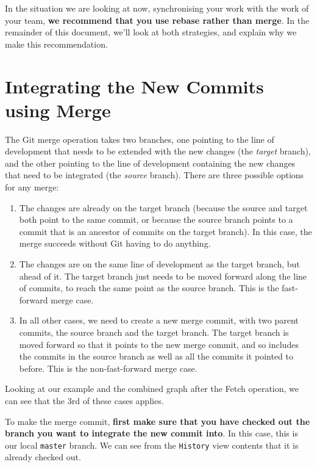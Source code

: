 \documentclass[
]{book}
\providecommand{\tightlist}{%
  \setlength{\itemsep}{0pt}\setlength{\parskip}{0pt}}
\begin{document}
In the situation we are looking at now, synchronising your work with the work of your team, \textbf{we recommend that you use rebase rather than merge}. In the remainder of this document, we'll look at both strategies, and explain why we make this recommendation.

\hypertarget{integrating-the-new-commits-using-merge}{%
\section{Integrating the New Commits using Merge}\label{integrating-the-new-commits-using-merge}}

The Git merge operation takes two branches, one pointing to the line of development that needs to be extended with the new changes (the \emph{target} branch), and the other pointing to the line of development containing the new changes that need to be integrated (the \emph{source} branch). There are three possible options for any merge:

\begin{enumerate}
\def\labelenumi{\arabic{enumi}.}
\tightlist
\item
  The changes are already on the target branch (because the source and target both point to the same commit, or because the source branch points to a commit that is an ancestor of commits on the target branch). In this case, the merge succeeds without Git having to do anything.
\item
  The changes are on the same line of development as the target branch, but ahead of it. The target branch just needs to be moved forward along the line of commits, to reach the same point as the source branch. This is the fast-forward merge case.
\item
  In all other cases, we need to create a new merge commit, with two parent commits, the source branch and the target branch. The target branch is moved forward so that it points to the new merge commit, and so includes the commits in the source branch as well as all the commits it pointed to before. This is the non-fast-forward merge case.
\end{enumerate}

Looking at our example and the combined graph after the Fetch operation, we can see that the 3rd of these cases applies.

To make the merge commit, \textbf{first make sure that you have checked out the branch you want to integrate the new commit into}. In this case, this is our local \texttt{master} branch. We can see from the \texttt{History} view contents that it is already checked out.
\end{document}
